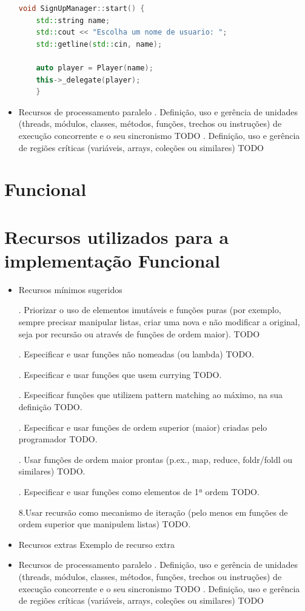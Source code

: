 \documentclass[rel_mlp]{iiufrgs}
\begin{document}
\begin{itemize}
\begin{lstlisting}[language=C++, caption={Uso de delegate}]
	void SignUpManager::start() {
	std::string name;
	std::cout << "Escolha um nome de usuario: ";
	std::getline(std::cin, name);
	
	auto player = Player(name);
	this->_delegate(player);
	}
	\end{lstlisting}
	
	
	\item Recursos de processamento paralelo
	. Definição, uso e gerência de unidades (threads, módulos, classes, métodos, funções, trechos ou instruções) de execução concorrente e o seu sincronismo TODO
	. Definição, uso e gerência de regiões críticas (variáveis, arrays, coleções ou similares) TODO

\end{itemize}

\section{Funcional}

\section{Recursos utilizados para a implementação Funcional}
\begin{itemize}
	\item Recursos mínimos sugeridos
	
	. Priorizar o uso de elementos imutáveis e funções puras (por exemplo, sempre precisar manipular listas, criar uma nova e não modificar a original, seja por recursão ou através de funções de ordem maior). TODO
	
	. Especificar e usar funções não nomeadas (ou lambda) TODO.
	
	. Especificar e usar funções que usem currying TODO.
	
	. Especificar funções que utilizem pattern matching ao máximo, na sua definição TODO.
	
	. Especificar e usar funções de ordem superior (maior) criadas pelo programador TODO.
	
	. Usar funções de ordem maior prontas (p.ex., map, reduce, foldr/foldl ou similares) TODO.
	
	. Especificar e usar funções como elementos de 1ª ordem TODO.
	
	\subitem 8.Usar recursão como mecanismo de iteração (pelo menos em funções de ordem superior que manipulem listas) TODO.
	
	\item Recursos extras
	\subitem Exemplo de recurso extra
	
	\item Recursos de processamento paralelo
		. Definição, uso e gerência de unidades (threads, módulos, classes, métodos, funções, trechos ou instruções) de execução concorrente e o seu sincronismo TODO
		. Definição, uso e gerência de regiões críticas (variáveis, arrays, coleções ou similares) TODO
	
\end{itemize}
\end{document}
